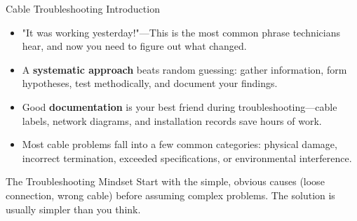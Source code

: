 \documentclass[aspectratio=169]{beamer}
\begin{document}
\begin{frame}{Cable Troubleshooting Introduction}
    \begin{itemize}
        \item "It was working yesterday!"---This is the most common phrase technicians hear, and now you need to figure out what changed.
        \item A \textbf{systematic approach} beats random guessing: gather information, form hypotheses, test methodically, and document your findings.
        \item Good \textbf{documentation} is your best friend during troubleshooting---cable labels, network diagrams, and installation records save hours of work.
        \item Most cable problems fall into a few common categories: physical damage, incorrect termination, exceeded specifications, or environmental interference.
    \end{itemize}
    
    \vspace{0.3cm}
    \begin{block}{The Troubleshooting Mindset}
        Start with the simple, obvious causes (loose connection, wrong cable) before assuming complex problems. The solution is usually simpler than you think.
    \end{block}
\end{frame}
\end{document}
